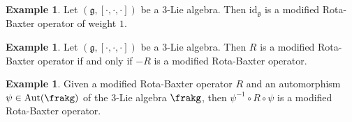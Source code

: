 \documentclass[12pt]{amsart}
\theoremstyle{definition}
\newtheorem{exam}[theorem]{Example}
\begin{document}
\begin{exam}
Let $(\mathfrak{g}, [\cdot, \cdot, \cdot])$ be a $3$-Lie algebra. Then $\mathrm{id}_\mathfrak{g}$ is a modified Rota-Baxter operator of weight $1$.
\end{exam}

\begin{exam}
Let $(\mathfrak{g}, [\cdot, \cdot, \cdot])$ be a $3$-Lie algebra.  Then $R$ is a modified Rota-Baxter operator if and only if   $-R$ is a modified Rota-Baxter operator.
\end{exam}

\begin{exam}
 Given a modified Rota-Baxter operator  $R$ and an automorphism $\psi\in \mathrm{Aut}(\frakg)$ of the $3$-Lie
algebra $\frakg$, then  $\psi^{-1} \circ R \circ \psi$  is a modified Rota-Baxter operator.
\end{exam}
\end{document}
